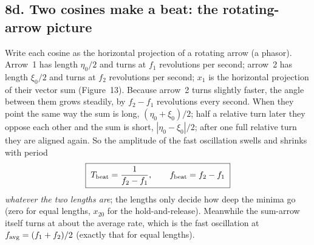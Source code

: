 \documentclass[11pt,a4paper]{article}
\begin{document}
\subsection*{8d. Two cosines make a beat: the rotating-arrow picture}

Write each cosine as the horizontal projection of a rotating arrow (a phasor). Arrow~1 has length $\eta_0/2$ and turns at $f_1$ revolutions per second; arrow~2 has length $\xi_0/2$ and turns at $f_2$ revolutions per second; $x_1$ is the horizontal projection of their vector sum (Figure~13). Because arrow~2 turns slightly faster, the angle between them grows steadily, by $f_2-f_1$ revolutions every second. When they point the same way the sum is long, $(\eta_0+\xi_0)/2$; half a relative turn later they oppose each other and the sum is short, $|\eta_0-\xi_0|/2$; after one full relative turn they are aligned again. So the amplitude of the fast oscillation swells and shrinks with period
\begin{equation}
\boxed{\;T_{\rm beat}=\frac{1}{f_2-f_1},\qquad f_{\rm beat}=f_2-f_1\;}
\end{equation}
\emph{whatever the two lengths are}; the lengths only decide how deep the minima go (zero for equal lengths, $x_{20}$ for the hold-and-release). Meanwhile the sum-arrow itself turns at about the average rate, which is the fast oscillation at $f_{\rm avg}=(f_1+f_2)/2$ (exactly that for equal lengths).
\end{document}
